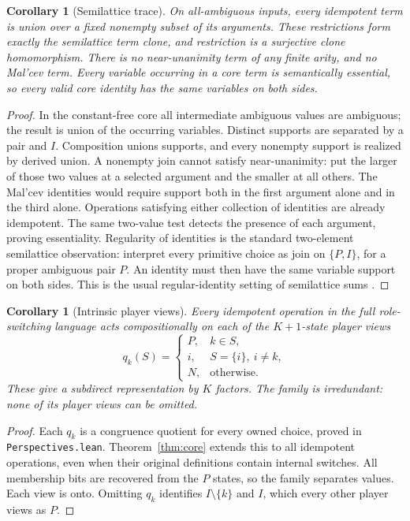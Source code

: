 \documentclass[11pt]{article}
\newtheorem{corollary}[theorem]{Corollary}
\begin{document}
\begin{corollary}[Semilattice trace]\label{cor:trace}
On all-ambiguous inputs, every idempotent term is union over a fixed
nonempty subset of its arguments. These restrictions form exactly the
semilattice term clone, and restriction is a surjective clone
homomorphism. There is no near-unanimity term of any finite arity, and
no Mal'cev term. Every variable occurring in a core term is semantically
essential, so every valid core identity has the same variables on both
sides.
\end{corollary}
\begin{proof}
In the constant-free core all intermediate ambiguous values are
ambiguous; the result is union of the occurring variables. Distinct
supports are separated by a pair and $I$. Composition unions supports,
and every nonempty support is realized by derived union. A nonempty
join cannot satisfy near-unanimity: put the larger of those two values
at a selected argument and the smaller at all others. The Mal'cev
identities would require support both in the first argument alone and
in the third alone. Operations satisfying either collection of
identities are already idempotent. The same two-value test detects the
presence of each argument, proving essentiality. Regularity of identities
is the standard two-element semilattice observation: interpret every
primitive choice as join on $\{P,I\}$, for a proper ambiguous pair $P$.
An identity must then have the same variable support on both sides.
This is the usual regular-identity setting of semilattice sums
\cite{Plonka1967}.
\end{proof}

\begin{corollary}[Intrinsic player views]\label{cor:views}
Every idempotent operation in the full role-switching language acts
compositionally on each of the $K+1$-state player views
\[
 q_k(S)=
 \begin{cases}
 P,&k\in S,\\
 i,&S=\{i\},\ i\ne k,\\
 N,&\text{otherwise}.
 \end{cases}
\]
These give a subdirect representation by $K$ factors. The family is
irredundant: none of its player views can be omitted.
\end{corollary}
\begin{proof}
Each $q_k$ is a congruence quotient for every owned choice, proved in
\texttt{Perspectives.lean}. Theorem~\ref{thm:core} extends this to all
idempotent operations, even when their original definitions contain
internal switches. All membership bits are recovered from the $P$
states, so the family separates values. Each view is onto. Omitting
$q_k$ identifies $I\setminus\{k\}$ and $I$, which every other player
views as $P$.
\end{proof}
\end{document}

